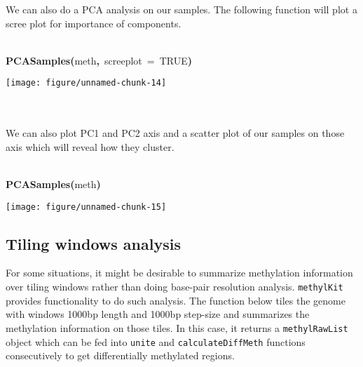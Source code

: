 \documentclass{article}
\makeatletter
\newcommand{\hlnumber}[1]{\textcolor[rgb]{0,0,0}{#1}}%
\newcommand{\hlfunctioncall}[1]{\textcolor[rgb]{.5,0,.33}{\textbf{#1}}}%
\newcommand{\hlkeyword}[1]{\textbf{#1}}%
\newcommand{\hlargument}[1]{\textcolor[rgb]{.69,.25,.02}{#1}}%
\newcommand{\hlsymbol}[1]{#1}%
\newcommand{\hlstd}[1]{\textcolor[rgb]{0,0,0}{#1}}%
\newenvironment{kframe}{%
 \def\FrameCommand##1{\hskip\@totalleftmargin \hskip-\fboxsep
 \colorbox{shadecolor}{##1}\hskip-\fboxsep
     \hskip-\linewidth \hskip-\@totalleftmargin \hskip\columnwidth}%
 \MakeFramed {\advance\hsize-\width
   \@totalleftmargin\z@ \linewidth\hsize
   \@setminipage}}%
 {\par\unskip\endMakeFramed}
\newenvironment{knitrout}{}{} %
\makeatother
\begin{document}
We can also do a PCA analysis on our samples. The following function will plot a scree plot for importance of components.
\begin{center}
\begin{knitrout}
\color{fgcolor}\begin{kframe}
\begin{flushleft}
\ttfamily\noindent
\hspace*{\fill}\\
\hlstd{}\hlfunctioncall{PCASamples}\hlkeyword{(}\hlsymbol{meth}\hlkeyword{,}{\ }\hlargument{screeplot}{\ }\hlargument{=}{\ }\hlnumber{TRUE}\hlkeyword{)}\mbox{}
\normalfont
\end{flushleft}
\end{kframe}

{\centering \texttt{[image: figure/unnamed-chunk-14]} 

}


\end{knitrout}

\end{center}
\\
\\
We can also plot PC1 and PC2 axis and a scatter plot of our samples on those axis which will reveal how they cluster.

\begin{center}
\begin{knitrout}
\color{fgcolor}\begin{kframe}
\begin{flushleft}
\ttfamily\noindent
\hspace*{\fill}\\
\hlstd{}\hlfunctioncall{PCASamples}\hlkeyword{(}\hlsymbol{meth}\hlkeyword{)}\mbox{}
\normalfont
\end{flushleft}
\end{kframe}

{\centering \texttt{[image: figure/unnamed-chunk-15]} 

}


\end{knitrout}

\end{center}


\subsection{Tiling windows analysis}
For some situations, it might be desirable to summarize methylation information over tiling windows rather than doing base-pair resolution analysis. \texttt{methylKit} provides functionality to do such analysis. The function below tiles the genome with windows 1000bp length and 1000bp step-size and summarizes the methylation information on those tiles. In this case, it returns a \texttt{methylRawList} object which can be fed into \texttt{unite} and \texttt{calculateDiffMeth} functions consecutively to get differentially methylated regions.
\end{document}
